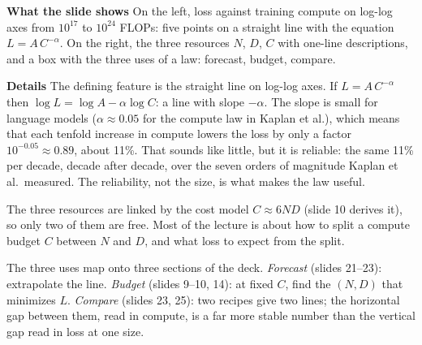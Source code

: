\documentclass[11pt,letterpaper]{article}
\newcommand{\para}[1]{\medskip\noindent\textbf{#1}\quad}
\begin{document}
\para{What the slide shows} On the left, loss against training compute on log-log axes from $10^{17}$ to $10^{24}$ FLOPs: five points on a straight line with the equation $L = A\,C^{-\alpha}$. On the right, the three resources $N$, $D$, $C$ with one-line descriptions, and a box with the three uses of a law: forecast, budget, compare.

\para{Details} The defining feature is the straight line on log-log axes. If $L = A\,C^{-\alpha}$ then $\log L = \log A - \alpha \log C$: a line with slope $-\alpha$. The slope is small for language models ($\alpha\approx0.05$ for the compute law in Kaplan et al.), which means that each tenfold increase in compute lowers the loss by only a factor $10^{-0.05}\approx0.89$, about 11\%. That sounds like little, but it is reliable: the same 11\% per decade, decade after decade, over the seven orders of magnitude Kaplan et al.\ measured. The reliability, not the size, is what makes the law useful.

The three resources are linked by the cost model $C\approx6ND$ (slide 10 derives it), so only two of them are free. Most of the lecture is about how to split a compute budget $C$ between $N$ and $D$, and what loss to expect from the split.

The three uses map onto three sections of the deck. \emph{Forecast} (slides 21--23): extrapolate the line. \emph{Budget} (slides 9--10, 14): at fixed $C$, find the $(N,D)$ that minimizes $L$. \emph{Compare} (slides 23, 25): two recipes give two lines; the horizontal gap between them, read in compute, is a far more stable number than the vertical gap read in loss at one size.
\end{document}
